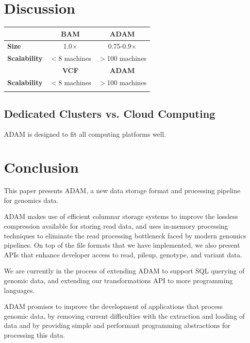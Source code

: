 \documentclass{bioinfo}
\begin{document}
\section{Discussion}
\label{sec:discussion}

\begin{table}[h]
{\begin{tabular}{ l c c }
\toprule
 & \bf BAM & \bf ADAM \\
\midrule
\bf Size & 1.0$\times$ & 0.75-0.9$\times$ \\
\bf Scalability & $<$8 machines & $>$100 machines \\
\midrule
& \bf VCF & \bf ADAM \\
\midrule
\bf Scalability & $<$8 machines & $>$100 machines \\
\botrule
\end{tabular}}{}
\end{table}

\subsection{Dedicated Clusters vs. Cloud Computing}
\label{sec:dedicated-clusters-vs-cloud-computing}

ADAM is designed to fit all computing platforms well.

\section{Conclusion}
\label{sec:conclusion}

This paper presents ADAM, a new data storage format and processing pipeline for genomics data. 

ADAM makes use of efficient columnar storage systems to improve the lossless compression available
for storing read data, and uses in-memory processing techniques to eliminate the read processing bottleneck faced
by modern genomics pipelines. On top of the file formats that we have implemented, we also present APIs that enhance
developer access to read, pileup, genotype, and variant data. 

We are currently in the process of extending ADAM to support SQL querying of genomic data, and extending our transformations API
to more programming languages. 

ADAM promises to improve the development of applications that process genomic data, by removing current difficulties with the extraction
and loading of data and by providing simple and performant programming abstractions for processing this data.
\end{document}
